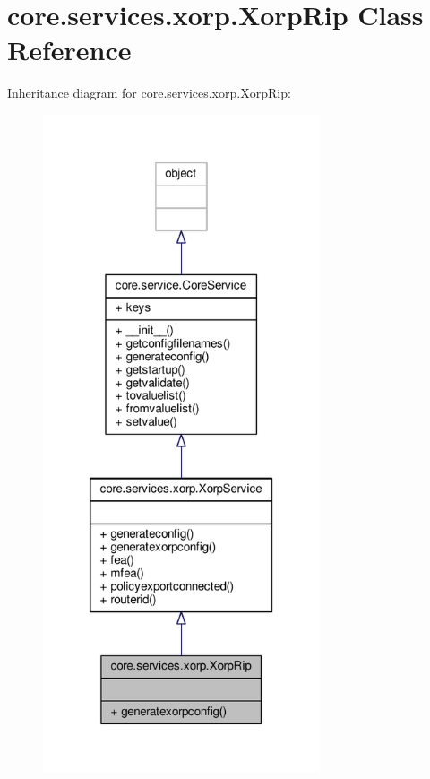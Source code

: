 \hypertarget{classcore_1_1services_1_1xorp_1_1_xorp_rip}{\section{core.\+services.\+xorp.\+Xorp\+Rip Class Reference}
\label{classcore_1_1services_1_1xorp_1_1_xorp_rip}
}


Inheritance diagram for core.\+services.\+xorp.\+Xorp\+Rip\+:
\nopagebreak
\begin{figure}[H]
\begin{center}
\leavevmode
\includegraphics[height=550pt]{classcore_1_1services_1_1xorp_1_1_xorp_rip__inherit__graph}
\end{center}
\end{figure}



